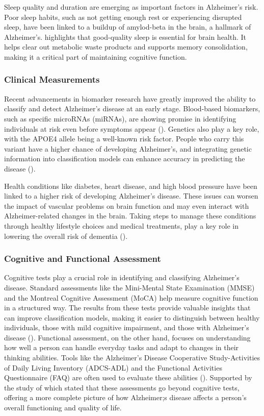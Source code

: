 \documentclass[12pt]{article}
\begin{document}
Sleep quality and duration are emerging as important factors in Alzheimer's risk. Poor sleep habits, such as not getting enough rest or experiencing disrupted sleep, have been linked to a buildup of amylod-beta in the brain, a hallmark of Alzheimer's. \cite{Dominguez2021} highlights
that good-quality sleep is essential for brain health. It helps clear out metabolic waste products and supports memory consolidation, making it a critical part of maintaining cognitive function.

\subsubsection{Clinical Measurements}
\noindent

Recent advancements in biomarker research have greatly improved the ability to classify and detect Alzheimer's disease at an early stage. Blood-based biomarkers, such as specific microRNAs (miRNAs), are showing promise in identifying individuals at risk even before symptoms appear 
(\cite{JAMA2019}). Genetics also play a key role, with the APOE4 allele being a well-known risk factor. People who carry this variant have a higher chance of developing Alzheimer's, and integrating genetic information into classification models can enhance accuracy in predicting the
disease (\cite{JAMA2019}).

Health conditions like diabetes, heart disease, and high blood pressure have been linked to a higher risk of developing Alzheimer's disease. These issues can worsen the impact of vascular problems on brain function and may even interact with Alzheimer-related changes in the brain. Taking
steps to manage these conditions through healthy lifestyle choices and medical treatments, play a key role in lowering the overall risk of dementia (\cite{PMC2021}).

\subsubsection{Cognitive and Functional Assessment}
\noindent

Cognitive tests play a crucial role in identifying and classifying Alzheimer's disease. Standard assessments like the Mini-Mental State Examination (MMSE) and the Montreal Cognitive Assessment (MoCA) help measure cognitive function in a structured way. The results from these tests provide 
valuable insights that can improve classification models, making it easier to distinguish between healthy individuals, those with mild cognitive impairment, and those with Alzheimer's disease (\cite{PMC2021}). Functional assessment, on the other hand, focuses on understanding how well a person
can handle everyday tasks and adapt to changes in their thinking abilities. Tools like the Alzheimer's Disease Cooperative Study-Activities of Daily Living Inventory (ADCS-ADL) and the Functional Activities Questionnaire (FAQ) are often used to evaluate these abilities (\cite{Custodio2022}). Supported by
the study of \cite{cummings2017} which stated that these assessments go beyond cognitive tests, offering a more complete picture of how Alzheimer;s disease affects a person's overall functioning and quality of life.
\end{document}
